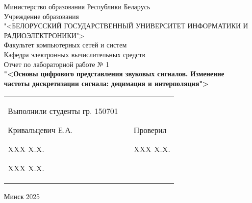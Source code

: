\begin{center}
  Министерство образования Республики Беларусь \\
  \bigskip
  Учреждение образования \\
  "<БЕЛОРУССКИЙ ГОСУДАРСТВЕННЫЙ УНИВЕРСИТЕТ ИНФОРМАТИКИ И РАДИОЭЛЕКТРОНИКИ"> \\
  \bigskip \bigskip
  Факультет компьютерных сетей и систем \\
  Кафедра электронных вычислительных средств \\
  \bigskip \bigskip \bigskip \bigskip \bigskip \bigskip \bigskip \bigskip \bigskip \bigskip \bigskip \bigskip
  Отчет по лабораторной работе № 1 \\
  \bf{"<Основы цифрового представления звуковых сигналов.
  Изменение частоты дискретизации сигнала: децимация и
  интерполяция">}\normalfont \\
  \bigskip \bigskip \bigskip \bigskip \bigskip \bigskip \bigskip \bigskip \bigskip \bigskip \bigskip \bigskip
  \begin{table}[ht]
    \begin{tabular}{p{7cm} p{1cm} p{7cm}}
        Выполнили студенты гр. 150701 \par Кривальцевич Е.А. \par XXX X.X.\par XXX X.X.& \hfill & \hspace*{30 mm}Проверил \par \hspace*{29 mm} XXX X.X.
    \end{tabular}
  \end{table}
  \vfill \vfill
  \centerline{Минск 2025}
\end{center}
\newpage
